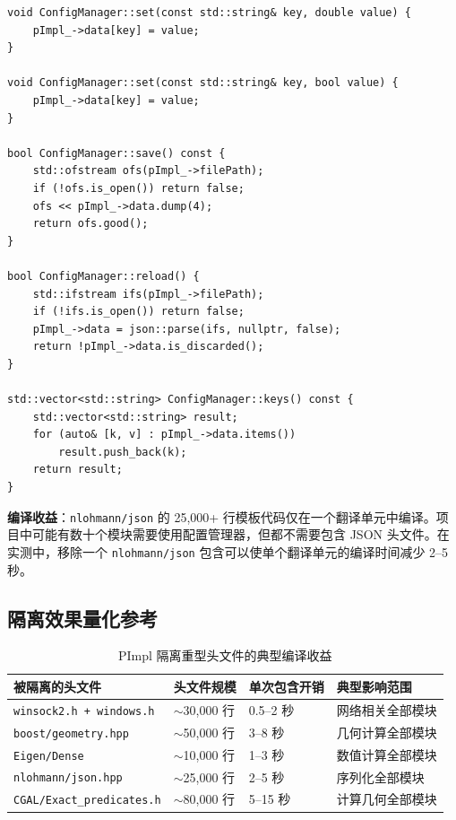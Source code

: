 \documentclass[12pt,a4paper,fontset=fandol]{ctexbook}
\begin{document}
\begin{lstlisting}[caption={配置管理器——实现文件隔离 JSON 库}]
void ConfigManager::set(const std::string& key, double value) {
    pImpl_->data[key] = value;
}

void ConfigManager::set(const std::string& key, bool value) {
    pImpl_->data[key] = value;
}

bool ConfigManager::save() const {
    std::ofstream ofs(pImpl_->filePath);
    if (!ofs.is_open()) return false;
    ofs << pImpl_->data.dump(4);
    return ofs.good();
}

bool ConfigManager::reload() {
    std::ifstream ifs(pImpl_->filePath);
    if (!ifs.is_open()) return false;
    pImpl_->data = json::parse(ifs, nullptr, false);
    return !pImpl_->data.is_discarded();
}

std::vector<std::string> ConfigManager::keys() const {
    std::vector<std::string> result;
    for (auto& [k, v] : pImpl_->data.items())
        result.push_back(k);
    return result;
}
\end{lstlisting}

\textbf{编译收益}：\texttt{nlohmann/json} 的 25,000+ 行模板代码仅在一个翻译单元中编译。项目中可能有数十个模块需要使用配置管理器，但都不需要包含 JSON 头文件。在实测中，移除一个 \texttt{nlohmann/json} 包含可以使单个翻译单元的编译时间减少 2--5 秒。

\subsection{隔离效果量化参考}

\begin{table}[ht]
\centering
\caption{PImpl 隔离重型头文件的典型编译收益}
\label{tab:isolation-benefit}
\begin{tabular}{@{}llll@{}}
\toprule
\textbf{被隔离的头文件} & \textbf{头文件规模} & \textbf{单次包含开销} & \textbf{典型影响范围} \\
\midrule
\texttt{winsock2.h + windows.h}   & $\sim$30,000 行 & 0.5--2 秒  & 网络相关全部模块 \\
\texttt{boost/geometry.hpp}       & $\sim$50,000 行 & 3--8 秒   & 几何计算全部模块 \\
\texttt{Eigen/Dense}              & $\sim$10,000 行 & 1--3 秒   & 数值计算全部模块 \\
\texttt{nlohmann/json.hpp}        & $\sim$25,000 行 & 2--5 秒   & 序列化全部模块 \\
\texttt{CGAL/Exact\_predicates.h} & $\sim$80,000 行 & 5--15 秒  & 计算几何全部模块 \\
\bottomrule
\end{tabular}
\end{table}
\end{document}
